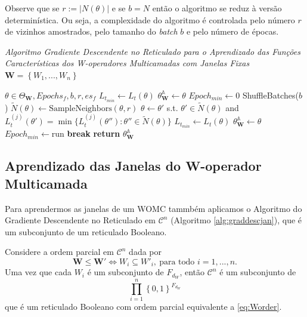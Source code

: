 Observe que se $r := |N\left(\theta\right)|$ e se $b=N$ então o algoritmo se reduz à versão determinística. Ou seja, a complexidade do algoritmo é controlada pelo número $r$ de vizinhos amostrados, pelo tamanho do \textit{batch} $b$ e pelo número de épocas.

\begin{algorithm}
    \caption{\textit{Algoritmo Gradiente Descendente no Reticulado para o Aprendizado das Funções Características dos W-operadores Multicamadas com Janelas Fixas $\textbf{W} = \left\{ W_{1},...,W_{n} \right\} $}}\label{alg:graddescfunc}
    \begin{algorithmic}[1]
        \Ensure $ \theta \in \Theta_{\textbf{W}}, Epochs_{f}, b, r, es_f $
        \State $L_{t_{min}}\leftarrow L_{t} \left( \theta \right)$
        \State $\theta_{\textbf{W}}^{\mathbb{A}} \gets \theta$
        \State $Epoch_{min} \leftarrow 0$
            \State ShuffleBatches($b$)
                \State $\tilde{N} \left(\theta\right) \leftarrow \text{SampleNeighbors}\left(\theta,r\right)$
                \State $\theta \leftarrow \theta'$ s.t. $\theta' \in \tilde{N}\left(\theta\right)$ and $L_{t}^{\left(j\right)}\left(\theta'\right) = \min\{L_{t}^{\left(j\right)}\left(\theta''\right):\theta'' \in \tilde{N}\left(\theta\right) \}$
            \EndFor
                \State $L_{t_{min}}\leftarrow L_{t} \left( \theta \right)$
                \State $\theta_{\textbf{W}}^{\mathbb{A}} \gets \theta$
                \State $Epoch_{min} \leftarrow \text{run}$
            \EndIf
                \State \textbf{break}
            \EndIf
        \EndFor
        \State \textbf{return} $\theta_{\textbf{W}}^{\mathbb{A}}$
    \end{algorithmic}
\end{algorithm}

\subsection{Aprendizado das Janelas do W-operador Multicamada}

Para aprendermos as janelas de um WOMC tammbém aplicamos o Algoritmo do Gradiente Descendente no Reticulado em $\mathscr{C}^{n}$ (Algoritmo \ref{alg:graddescjan}), que é um subconjunto de um reticulado Booleano. 

Considere a ordem parcial em $\mathscr{C}^{n}$ dada por
\begin{equation}
    \textbf{W} \leq \textbf{W}' \iff W_{i} \subseteq W'_{i}, \ \text{para todo } i=1,...,n.
    \label{eq:Worder}
\end{equation}
Uma vez que cada $W_{i}$ é um subconjunto de $F_{d_{W}}$, então $\mathscr{C}^{n} $ é um subconjunto de
$$\prod_{i=1}^{n} \left\{ 0,1 \right\}^{F_{d_{W}}} $$
que é um reticulado Booleano com ordem parcial equivalente a \eqref{eq:Worder}.

